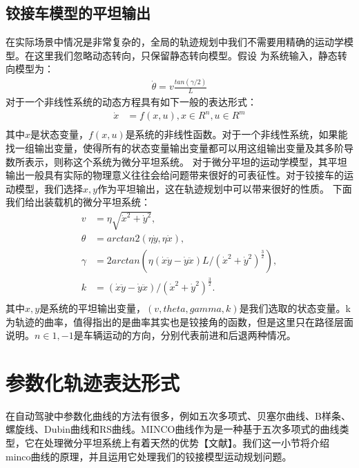 \documentclass[master,academic]{ysuthesis} %
\begin{document}
		\subsection{铰接车模型的平坦输出}
		在实际场景中情况是非常复杂的，全局的轨迹规划中我们不需要用精确的运动学模型。在这里我们忽略动态转向，只保留静态转向模型。假设 为系统输入，静态转向模型为：
		\begin{equation}
			\begin{aligned}
				\dot{\theta}=v\frac{tan( \gamma /2 )}{L}
			\end{aligned}
		\end{equation}
		对于一个非线性系统的动态方程具有如下一般的表达形式：
		\begin{equation}
			\begin{aligned}
				\dot{x}&=f( x,u ) ,x\in R^n,u\in R^m\\
			\end{aligned}
		\end{equation}
		其中$x$是状态变量，$f(x,u)$是系统的非线性函数。对于一个非线性系统，如果能找一组输出变量，使得所有的状态变量输出变量都可以用这组输出变量及其多阶导数所表示，则称这个系统为微分平坦系统。
		对于微分平坦的运动学模型，其平坦输出一般具有实际的物理意义往往会给问题带来很好的可表征性。对于铰接车的运动模型，我们选择$x,y$作为平坦输出，这在轨迹规划中可以带来很好的性质。
		下面我们给出装载机的微分平坦系统：
		\begin{equation}
			\begin{aligned}
				v&=\eta \sqrt{\dot{x}^2+\dot{y}^2},\\
				\theta &=arctan2( \eta \dot{y},\eta \dot{x} ) ,\\
				\gamma &=2arctan( \eta ( \dot{x}\ddot{y}-\dot{y}\ddot{x} ) L/( \dot{x}^2+\dot{y}^2 ) ^{\frac{3}{2}} ) ,\\
				k&=( \dot{x}\ddot{y}-\dot{y}\ddot{x} ) /( \dot{x}^2+\dot{y}^2 ) ^{\frac{3}{2}}.\\
			\end{aligned}
		\end{equation}
	其中$x,y$是系统的平坦输出变量，$(v,theta,gamma,k)$是我们选取的状态变量。k为轨迹的曲率，值得指出的是曲率其实也是铰接角的函数，但是这里只在路径层面说明。$n\in{1,-1}$是车辆运动的方向，分别代表前进和后退两种情况。
	\section{参数化轨迹表达形式}
	在自动驾驶中参数化曲线的方法有很多，例如五次多项式、贝塞尔曲线、B样条、螺旋线、Dubin曲线和RS曲线。MINCO曲线作为是一种基于五次多项式的曲线类型，它在处理微分平坦系统上有着天然的优势【文献】。我们这一小节将介绍minco曲线的原理，并且运用它处理我们的铰接模型运动规划问题。
\end{document}
